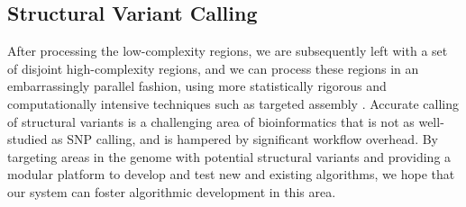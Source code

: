\documentclass[10pt]{article}
\begin{document}
\subsection{Structural Variant Calling}

After processing the low-complexity regions, we are subsequently left with a set
of disjoint high-complexity regions, and we can process 
these regions in an embarrassingly parallel fashion, using more statistically rigorous
and computationally intensive techniques such as targeted assembly \cite{telescoper}.
Accurate calling of structural variants is a challenging area of bioinformatics
that is not as well-studied as SNP calling, and is hampered by significant
workflow overhead.  By targeting areas in the genome with potential structural
variants and providing a modular platform to develop and test new and existing
algorithms, we hope that our system can foster algorithmic development in this
area.

%
\end{document}
